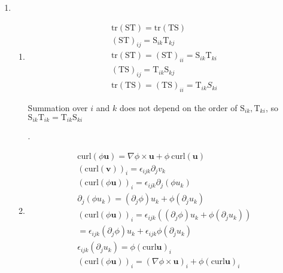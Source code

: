 \begin{problem}
    \noindent
    \normalfont

    \begin{enumerate}
        \item \begin{enumerate}
            \item \begin{align}
                \text{tr}(\text{ST})=\text{tr}(\text{TS}) \\
                (\text{ST})_{ij}=\text{S}_{ik}\text{T}_{kj} \\
                \text{tr}(\text{ST})=(\text{ST})_{ii}=\text{S}_{ik}\text{T}_{ki} \\
                (\text{TS})_{ij}=\text{T}_{ik}\text{S}_{kj} \\
                \text{tr}(\text{TS})=(\text{TS})_{ii}=\text{T}_{ik}S_{ki}
                \end{align}
                
                Summation over $i$ and $k$ does not depend on the order of $\text{S}_{ik}, \text{T}_{ki}$, so $\text{S}_{ik}\text{T}_{ik}=\text{T}_{ik}\text{S}_{ki}$
                
                .
                
            \item \begin{align}
                \text{curl}(\phi \mathbf{u})=\nabla \phi \times \mathbf{u}+\phi\ \text{curl}(\mathbf{u}) \\
                (\text{curl}(\mathbf{v}))_{i}=\epsilon_{ijk}\partial_{j}v_{k} \\
                (\text{curl}(\phi \mathbf{u}))_{i}=\epsilon_{ijk}\partial_{j}(\phi u_{k}) \\
                \partial_{j}(\phi u_{k})=(\partial_{j}\phi)u_{k}+\phi(\partial_{j}u_{k}) \\
                (\text{curl}(\phi \mathbf{u}))_{i}=\epsilon_{ijk}((\partial_{j}\phi)u_{k}+\phi(\partial_{j}u_{k})) \\
                =\epsilon_{ijk}(\partial_{j}\phi)u_{k}+\epsilon_{ijk}\phi(\partial_{j}u_{k}) \\
                \epsilon_{ijk}(\partial_{j}u_{k})=\phi(\text{curl}\mathbf{u})_{i} \\
                (\text{curl}(\phi \mathbf{u}))_{i}=(\nabla \phi \times \mathbf{u})_{i}+\phi(\text{curl}\mathbf{u})_{i} \\
            \end{align}


\end{enumerate}
\end{enumerate}
\end{problem}
